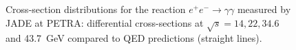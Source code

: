 \documentclass[a4paper,10pt]{article}
\begin{document}
\begin{figure}[htb]
\begin{center}
\caption{Cross-section distributions for the reaction $e^+e^-\rightarrow \gamma\gamma$ measured
by JADE at PETRA: differential cross-sections at $\sqrt{s} = 14, 22, 34.6$ and 43.7~GeV compared
to QED predictions (straight lines).}
\end{center}
\end{figure}
%
\vskip 5cm
\doclicenseThis
\end{document}
